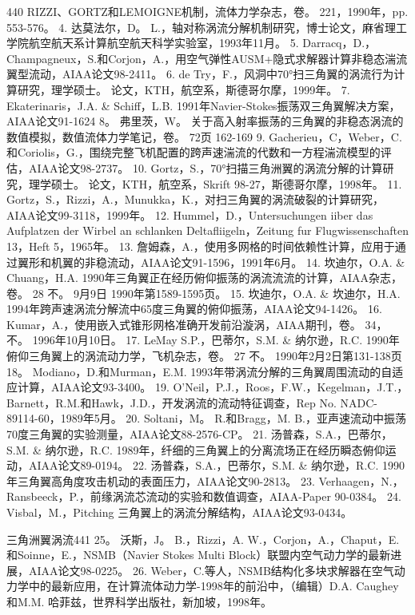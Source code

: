 \documentclass[UTF8,11pt,a4paper,openany,fontset=fandol]{ctexbook}
\begin{document}
440 RIZZI、GORTZ和LEMOIGNE机制，流体力学杂志，卷。 221，1990年，pp. 553-576。 4. 达莫法尔，D。 L.，轴对称涡流分解机制研究，博士论文，麻省理工学院航空航天系计算航空航天科学实验室，1993年11月。 5. Darracq，D.，Champagneux，S.和Corjon，A.，用空气弹性AUSM+隐式求解器计算非稳态湍流 翼型流动，AIAA论文98-2411。 6. de Try，F.，风洞中70°扫三角翼的涡流行为计算研究，理学硕士。 论文，KTH，航空系，斯德哥尔摩，1999年。 7. Ekaterinaris，J.A. \& Schiff，L.B. 1991年Navier-Stokes振荡双三角翼解决方案，AIAA论文91-1624 8。 弗里茨，W。 关于高入射率振荡的三角翼的非稳态涡流的数值模拟，数值流体力学笔记，卷。 72页 162-169 9. Gacherieu，C，Weber，C.和Coriolis，G.，围绕完整飞机配置的跨声速湍流的代数和一方程湍流模型的评估，AIAA论文98-2737。 10. Gortz，S.，70°扫描三角洲翼的涡流分解的计算研究，理学硕士。 论文，KTH，航空系，Skrift 98-27，斯德哥尔摩，1998年。 11. Gortz，S.，Rizzi，A.，Munukka，K.，对扫三角翼的涡流破裂的计算研究，AIAA论文99-3118，1999年。 12. Hummel，D.，Untersuchungen iiber das Aufplatzen der Wirbel an schlanken Deltafliigeln，Zeitung fur Flugwissenschaften 13，Heft 5，1965年。 13. 詹姆森，A.，使用多网格的时间依赖性计算，应用于通过翼形和机翼的非稳流动，AIAA论文91-1596，1991年6月。 14. 坎迪尔，O.A. \& Chuang，H.A. 1990年三角翼正在经历俯仰振荡的涡流流流的计算，AIAA杂志，卷。 28 不。 9月9日 1990年第1589-1595页。 15. 坎迪尔，O.A. \& 坎迪尔，H.A. 1994年跨声速涡流分解流中65度三角翼的俯仰振荡，AIAA论文94-1426。 16. Kumar，A.，使用嵌入式锥形网格准确开发前沿漩涡，AIAA期刊，卷。 34，不。 1996年10月10日。 17. LeMay S.P.，巴蒂尔，S.M. \& 纳尔逊，R.C. 1990年俯仰三角翼上的涡流动力学，飞机杂志，卷。 27 不。 1990年2月2日第131-138页18。 Modiano，D.和Murman，E.M. 1993年带涡流分解的三角翼周围流动的自适应计算，AIAA论文93-3400。 19. O'Neil，P.J.，Roos，F.W.，Kegelman，J.T.，Barnett，R.M.和Hawk，J.D.，开发涡流的流动特征调查，Rep No. NADC- 89114-60，1989年5月。 20. Soltani，M。 R.和Bragg，M. B.，亚声速流动中振荡70度三角翼的实验测量，AIAA论文88-2576-CP。 21. 汤普森，S.A.，巴蒂尔，S.M. \& 纳尔逊，R.C. 1989年，纤细的三角翼上的分离流场正在经历瞬态俯仰运动，AIAA论文89-0194。 22. 汤普森，S.A.，巴蒂尔，S.M. \& 纳尔逊，R.C. 1990年三角翼高角度攻击机动的表面压力，AIAA论文90-2813。 23. Verhaagen，N.，Ransbeeck，P.，前缘涡流芯流动的实验和数值调查，AIAA-Paper 90-0384。 24. Visbal，M.，Pitching 三角翼上的涡流分解结构，AIAA论文93-0434。

三角洲翼涡流441 25。 沃斯，J。 B.，Rizzi，A. W.，Corjon，A.，Chaput，E.和Soinne，E.，NSMB（Navier Stokes Multi Block）联盟内空气动力学的最新进展，AIAA论文98-0225。 26. Weber，C.等人，NSMB结构化多块求解器在空气动力学中的最新应用，在计算流体动力学-1998年的前沿中，（编辑）D.A. Caughey和M.M. 哈菲兹，世界科学出版社，新加坡，1998年。
\end{document}
